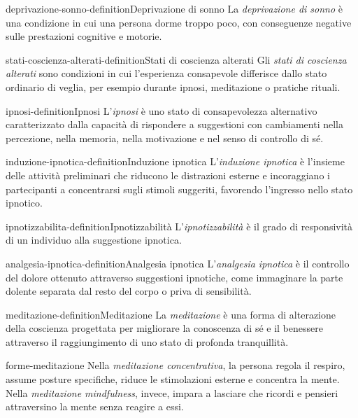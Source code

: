 \documentclass[preview]{standalone}
\begin{document}
\begin{snippetdefinition}{deprivazione-sonno-definition}{Deprivazione di sonno}
    La \emph{deprivazione di sonno} è una condizione in cui una persona dorme
    troppo poco, con conseguenze negative sulle prestazioni cognitive e motorie.
\end{snippetdefinition}

\begin{snippetdefinition}{stati-coscienza-alterati-definition}{Stati di coscienza alterati}
    Gli \emph{stati di coscienza alterati} sono condizioni in cui l'esperienza
    consapevole differisce dallo stato ordinario di veglia, per esempio durante
    ipnosi, meditazione o pratiche rituali.
\end{snippetdefinition}

\begin{snippetdefinition}{ipnosi-definition}{Ipnosi}
    L'\emph{ipnosi} è uno stato di consapevolezza alternativo caratterizzato
    dalla capacità di rispondere a suggestioni con cambiamenti nella percezione,
    nella memoria, nella motivazione e nel senso di controllo di sé.
\end{snippetdefinition}

\begin{snippetdefinition}{induzione-ipnotica-definition}{Induzione ipnotica}
    L'\emph{induzione ipnotica} è l'insieme delle attività preliminari che
    riducono le distrazioni esterne e incoraggiano i partecipanti a concentrarsi
    sugli stimoli suggeriti, favorendo l'ingresso nello stato ipnotico.
\end{snippetdefinition}

\begin{snippetdefinition}{ipnotizzabilita-definition}{Ipnotizzabilità}
    L'\emph{ipnotizzabilità} è il grado di responsività di un individuo alla
    suggestione ipnotica.
\end{snippetdefinition}

\begin{snippetdefinition}{analgesia-ipnotica-definition}{Analgesia ipnotica}
    L'\emph{analgesia ipnotica} è il controllo del dolore ottenuto attraverso
    suggestioni ipnotiche, come immaginare la parte dolente separata dal resto
    del corpo o priva di sensibilità.
\end{snippetdefinition}

\begin{snippetdefinition}{meditazione-definition}{Meditazione}
    La \emph{meditazione} è una forma di alterazione della coscienza progettata
    per migliorare la conoscenza di sé e il benessere attraverso il
    raggiungimento di uno stato di profonda tranquillità.
\end{snippetdefinition}

\begin{snippet}{forme-meditazione}
    Nella \emph{meditazione concentrativa}, la persona regola il respiro,
    assume posture specifiche, riduce le stimolazioni esterne e concentra la
    mente. Nella \emph{meditazione mindfulness}, invece, impara a lasciare che
    ricordi e pensieri attraversino la mente senza reagire a essi.
\end{snippet}
\end{document}
